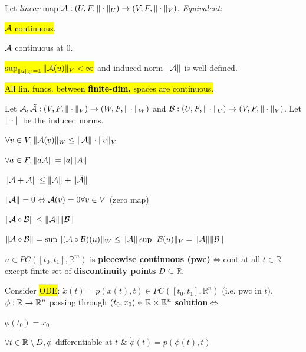 \begin{Theorem}
Let \textit{linear} map $\mathcal{A}:(U,F,\|\cdot\|_{U})\to(V,F,\|\cdot\|_{V})$. \textit{Equivalent}:
\begin{enumerate*}
  \item \hl{$\mathcal{A}$ continuous}.
  \item $\mathcal{A}$ continuous at 0.
  \item \hl{$\sup_{\|u\|_{U}=1}\|\mathcal{A}(u)\|_{V}<\infty$} and induced norm $\|\mathcal{A}\|_{}$ is well-defined.
\end{enumerate*}
\end{Theorem}
\begin{Corollary}
\hl{All lin. funcs. between \textbf{finite-dim.} spaces are continuous.}
\end{Corollary}
\begin{Theorem}
Let $\mathcal{A},\tilde{\mathcal{A}}:(V,F,\|\cdot\|_{V})\to(W,F,\|\cdot\|_{W})$ and $\mathcal{B}:(U,F,\|\cdot\|_{U})\to(V,F,\|\cdot\|_{V})$. Let $\|\cdot\|_{}$ be the induced norms.
\begin{enumerate*}[label=\protect\circled{\arabic*}]
  \item $\forall v\in V,\|\mathcal{A}(v)\|_{W}\le\|\mathcal{A}\|_{}\cdot\|v\|_{V}$
  \item $\forall a\in F,\|a\mathcal{A}\|_{}=|a|\|A\|_{}$
  \item $\|\mathcal{A}+\tilde{\mathcal{A}}\|_{}\le\|\mathcal{A}\|_{}+\|\tilde{\mathcal{A}}\|_{}$
  \item $\|\mathcal{A}\|_{}=0\Leftrightarrow\mathcal{A}(v)=0\forall v\in V$ (zero map)
  \item $\|\mathcal{A}\circ\mathcal{B}\|_{}\le\|\mathcal{A}\|_{}\|\mathcal{B}\|_{}$
\end{enumerate*}
\end{Theorem}
\begin{Proof}
$\|\mathcal{A}\circ\mathcal{B}\|_{}=\sup\|(\mathcal{A}\circ\mathcal{B})(u)\|_{W}\le\|\mathcal{A}\|_{}\sup\|\mathcal{B}(u)\|_{V}=\|\mathcal{A}\|_{}\|\mathcal{B}\|_{}$ \QED
\end{Proof}
\begin{Definition}
$u\in PC([t_0,t_1],\mathbb R^m)$ is \textbf{piecewise continuous (pwc)}$\Leftrightarrow$cont at all $t\in\mathbb R$ except finite set of \textbf{discontinuity points} $D\subseteq\mathbb R$.
\end{Definition}
\begin{Theorem}
Consider \hl{ODE}: $\dot x(t)=p(x(t),t)\in PC([t_0,t_1],\mathbb R^n)$ (i.e. pwc in $t$). $\phi:\mathbb R\to\mathbb R^n$ passing through $(t_0,x_0)\in\mathbb R\times\mathbb R^n$ \textbf{solution}$\Leftrightarrow$
\begin{itemize*}
  \item $\phi(t_0)=x_0$
  \item $\forall t\in\mathbb R\setminus D,\phi$ differentiable at $t$ \& $\dot\phi(t)=p(\phi(t),t)$
\end{itemize*}
\end{Theorem}
